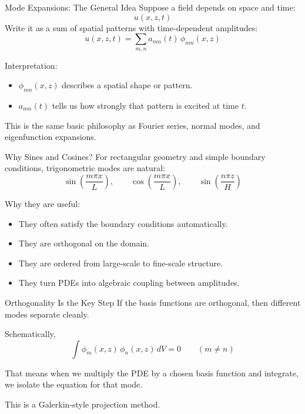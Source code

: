 \documentclass[aspectratio=169]{beamer}
\begin{document}
\begin{frame}{Mode Expansions: The General Idea}
Suppose a field depends on space and time:
\begin{equation*}
u(x,z,t)
\end{equation*}
Write it as a sum of spatial patterns with time-dependent amplitudes:
\begin{equation*}
u(x,z,t)=\sum_{m,n} a_{mn}(t)\,\phi_{mn}(x,z)
\end{equation*}

Interpretation:
\begin{itemize}
\item $\phi_{mn}(x,z)$ describes a spatial shape or pattern.
\item $a_{mn}(t)$ tells us how strongly that pattern is excited at time $t$.
\end{itemize}

This is the same basic philosophy as Fourier series, normal modes, and eigenfunction expansions.
\end{frame}

\begin{frame}{Why Sines and Cosines?}
For rectangular geometry and simple boundary conditions, trigonometric modes are natural:
\begin{equation*}
\sin\!\left(\frac{m\pi x}{L}\right), \qquad
\cos\!\left(\frac{m\pi x}{L}\right), \qquad
\sin\!\left(\frac{n\pi z}{H}\right)
\end{equation*}

Why they are useful:
\begin{itemize}
\item They often satisfy the boundary conditions automatically.
\item They are orthogonal on the domain.
\item They are ordered from large-scale to fine-scale structure.
\item They turn PDEs into algebraic coupling between amplitudes.
\end{itemize}
\end{frame}

\begin{frame}{Orthogonality Is the Key Step}
If the basis functions are orthogonal, then different modes separate cleanly.

Schematically,
\begin{equation*}
\int \phi_m(x,z)\,\phi_n(x,z)\,dV = 0
\qquad (m \neq n)
\end{equation*}

That means when we multiply the PDE by a chosen basis function and integrate, we isolate the equation for that mode.

\vspace{0.5em}

This is a Galerkin-style projection method.
\end{frame}
\end{document}
